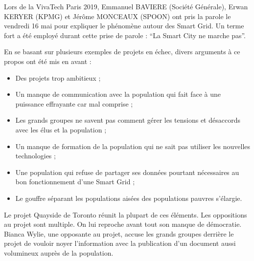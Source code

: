 Lors de la VivaTech Paris 2019, Emmanuel BAVIERE (Société Générale), Erwan KERYER (KPMG) 
et Jérôme MONCEAUX (SPOON) ont pris la parole le vendredi 16 mai pour expliquer le phénomène autour des 
Smart Grid. Un terme fort a été employé durant cette prise de parole : 
``La Smart City ne marche pas''.

En se basant sur plusieurs exemples de projets en échec, divers arguments à ce propos ont été mis en 
avant : 
\begin{itemize}
    \item Des projets trop ambitieux ;
    \item Un manque de communication avec la population qui fait face à une puissance effrayante car mal comprise ;
    \item Les grands groupes ne savent pas comment gérer les tensions et désaccords avec les élus et la population ; 
    \item Un manque de formation de la population qui ne sait pas utiliser les nouvelles technologies ;
    \item Une population qui refuse de partager ses données pourtant nécessaires au bon fonctionnement d’une Smart Grid ;
    \item Le gouffre séparant les populations aisées des populations pauvres s'élargie.
\end{itemize}

Le projet Quayside de Toronto réunit la plupart de ces éléments.
Les oppositions au projet sont multiple. On lui reproche avant tout son manque de démocratie.
Bianca Wylie, une opposante au projet, accuse les grands groupes derrière le projet de vouloir noyer l'information
avec la publication d'un document aussi volumineux auprès de la population.